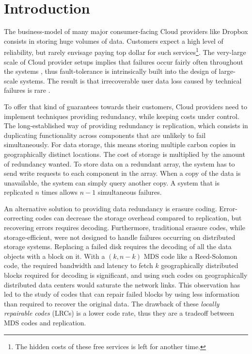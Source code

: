 \section{Introduction}
\label{sec:intro}

The business-model of many major consumer-facing Cloud providers like Dropbox consists in storing huge volumes of data. Customers expect a high level of reliability, but rarely envisage paying top dollar for such services\footnote{The hidden costs of these free services is left for another time.}. The very-large scale of Cloud provider setups implies that failures occur fairly often throughout the systems \autocite{failures-study}, thus fault-tolerance is intrinsically built into the design of large-scale systems. The result is that irrecoverable user data loss caused by technical failures is rare \autocite{racs}.

To offer that kind of guarantees towards their customers, Cloud providers need to implement techniques providing redundancy, while keeping costs under control. The long-established way of providing redundancy is replication, which consists in duplicating functionality across components that are unlikely to fail simultaneously. For data storage, this means storing multiple carbon copies in geographically distinct locations. The cost of storage is multiplied by the amount of redundancy wanted. To store data on a redundant array, the system has to send write requests to each component in the array. When a copy of the data is unavailable, the system can simply query another copy. A system that is replicated $n$ times allows $n-1$ simultaneous failures.

An alternative solution to providing data redundancy is erasure coding. Error-correcting codes can decrease the storage overhead compared to replication, but recovering errors requires decoding. Furthermore, traditional erasure codes, while storage-efficient, were not designed to handle failures occurring on distributed storage systems. Replacing a failed disk requires the decoding of all the data objects with a block on it. With a $(k,n-k)$ MDS code like a Reed-Solomon code, the required bandwidth and latency to fetch $k$ geographically distributed blocks required for decoding is significant, and using such codes on geographically distributed data centers would saturate the network links. This observation has led to the study of codes that can repair failed blocks by using less information than required to recover the original data. The drawback of these \emph{locally repairable codes} (LRCs) is a lower code rate, thus they are a tradeoff between MDS codes and replication.

